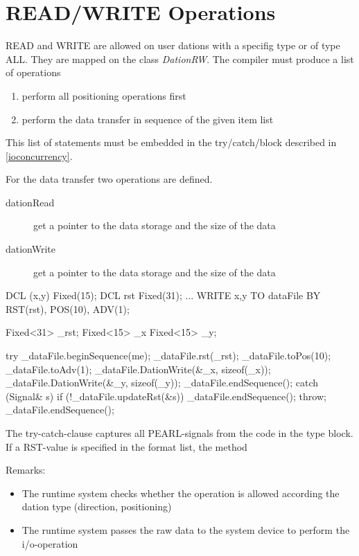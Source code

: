 \section{READ/WRITE Operations}
READ and WRITE are allowed on user dations with a specifig type or of type ALL.
They are mapped on the class {\em DationRW}. 
The compiler must produce a list of operations
\begin{enumerate}
\item perform all positioning operations first
\item perform the data transfer in sequence of the given item list
\end{enumerate}
This list of statements must be embedded in the try/catch/block described in
\ref{ioconcurrency}.

For the data transfer two operations are defined. 

\begin{description}
\item[dationRead]{get a pointer to the data storage and the size of the data}
\item[dationWrite]{get a pointer to the data storage and the size of the data}
\end{description}


\begin{PEARLCode}
DCL (x,y) Fixed(15);
DCL rst Fixed(31);
...
WRITE x,y TO dataFile BY RST(rst), POS(10), ADV(1);
\end{PEARLCode}

\begin{CppCode}
Fixed<31> _rst;
Fixed<15> _x
Fixed<15> _y;

try {
   _dataFile.beginSequence(me);
   _dataFile.rst(_rst);
   _dataFile.toPos(10);
   _dataFile.toAdv(1);
   _dataFile.DationWrite(&_x, sizeof(_x));
   _dataFile.DationWrite(&_y, sizeof(_y));
   _dataFile.endSequence();
} catch (Signal& s) {
   if (!_dataFile.updateRst(&s)) {
      _dataFile.endSequence();
      throw;
   }
   _dataFile.endSequence();
}
\end{CppCode}

The try-catch-clause captures all PEARL-signals from the code in the 
type block. If a RST-value is specified in the format list, the method

Remarks:
\begin{itemize}
\item The runtime system checks whether the operation is allowed according
    the dation type (direction, positioning)
\item The runtime system passes the raw data to the system device to
   perform the i/o-operation
\end{itemize}

